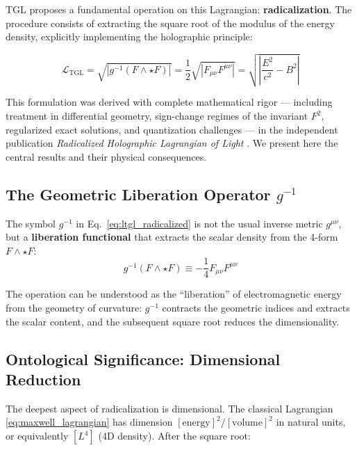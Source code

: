 \documentclass[12pt,a4paper,twoside]{article}
\newcommand{\Ltgl}{\mathcal{L}_{\text{TGL}}}
\begin{document}
TGL proposes a fundamental operation on this Lagrangian: \textbf{radicalization}. The procedure consists of extracting the square root of the modulus of the energy density, explicitly implementing the holographic principle:

\begin{equationbox}[title={Radicalized Holographic Lagrangian}]
\begin{equation}
\boxed{\Ltgl = \sqrt{\left|g^{-1}(F \wedge \star F)\right|} = \frac{1}{2}\sqrt{\left|F_{\mu\nu}F^{\mu\nu}\right|} = \sqrt{\left|\frac{E^2}{c^2} - B^2\right|}}
\label{eq:ltgl_radicalized}
\end{equation}
\end{equationbox}

\noindent This formulation was derived with complete mathematical rigor --- including treatment in differential geometry, sign-change regimes of the invariant $F^2$, regularized exact solutions, and quantization challenges --- in the independent publication \textit{Radicalized Holographic Lagrangian of Light} \cite{Miguel2025Zenodo}. We present here the central results and their physical consequences.

\subsection{The Geometric Liberation Operator $g^{-1}$}

The symbol $g^{-1}$ in Eq.~\eqref{eq:ltgl_radicalized} is not the usual inverse metric $g^{\mu\nu}$, but a \textbf{liberation functional} that extracts the scalar density from the 4-form $F \wedge \star F$:
\begin{equation}
g^{-1}(F \wedge \star F) \equiv -\frac{1}{4}F_{\mu\nu}F^{\mu\nu}
\label{eq:liberation_operator}
\end{equation}

The operation can be understood as the ``liberation'' of electromagnetic energy from the geometry of curvature: $g^{-1}$ contracts the geometric indices and extracts the scalar content, and the subsequent square root reduces the dimensionality.


\subsection{Ontological Significance: Dimensional Reduction}

The deepest aspect of radicalization is dimensional. The classical Lagrangian \eqref{eq:maxwell_lagrangian} has dimension $[\text{energy}]^2 / [\text{volume}]^2$ in natural units, or equivalently $[L^4]$ (4D density). After the square root:
\end{document}
